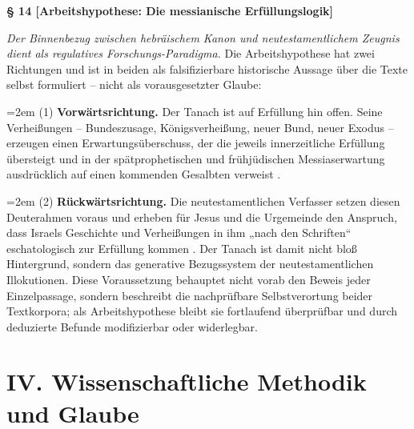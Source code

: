 \documentclass[11pt,a4paper]{article}
\makeatletter
\newcommand{\subpar}[1]{%
  \begingroup
  \leftskip=2em %
  \noindent#1\par
  \endgroup
}
\newcommand{\apthsec}[3]{%
  \phantomsection%
  \def\@currentlabel{#1}%
  \label{sec:#3}%
  \textbf{§ #1 [#2]}%
}
\makeatother
\begin{document}
\apthsec{14}{Arbeitshypothese: Die messianische Erfüllungslogik}{erfuellungslogik} 
\textit{Der Binnenbezug zwischen hebräischem Kanon und neutestamentlichem Zeugnis dient als regulatives Forschungs-Paradigma.}
Die Arbeitshypothese hat zwei Richtungen und ist in beiden als falsifizierbare historische Aussage über die Texte selbst formuliert – nicht als vorausgesetzter Glaube:

\subpar{(1) \textbf{Vorwärtsrichtung.} Der Tanach ist auf Erfüllung hin offen. Seine Verheißungen – Bundeszusage, Königsverheißung, neuer Bund, neuer Exodus – erzeugen einen Erwartungsüberschuss, der die jeweils innerzeitliche Erfüllung übersteigt und in der spätprophetischen und frühjüdischen Messiaserwartung ausdrücklich auf einen kommenden Gesalbten verweist \citep{zimmerli1952,vonrad1960,mowinckel1956,collins2010}.}

\subpar{(2) \textbf{Rückwärtsrichtung.} Die neutestamentlichen Verfasser setzen diesen Deuterahmen voraus und erheben für Jesus und die Urgemeinde den Anspruch, dass Israels Geschichte und Verheißungen in ihm „nach den Schriften“ eschatologisch zur Erfüllung kommen \citep{dodd1952,goppelt1939,hays1989,huebner1990,wright1992}. Der Tanach ist damit nicht bloß Hintergrund, sondern das generative Bezugssystem der neutestamentlichen Illokutionen. Diese Voraussetzung behauptet nicht vorab den Beweis jeder Einzelpassage, sondern beschreibt die nachprüfbare Selbstverortung beider Textkorpora; als Arbeitshypothese bleibt sie fortlaufend überprüfbar und durch deduzierte Befunde modifizierbar oder widerlegbar.}

\section*{IV. Wissenschaftliche Methodik und Glaube}
\end{document}
